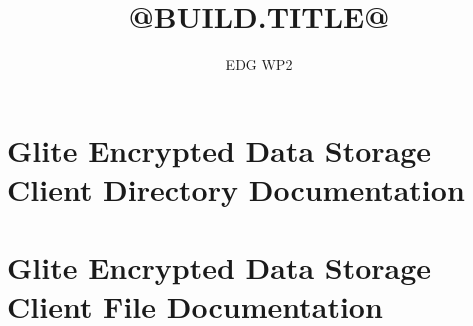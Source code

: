 \documentclass[a4paper]{datagridreport}
\title{@BUILD.TITLE@}
\author{EDG WP2}
\begin{document}
\section{Glite Encrypted Data Storage Client Directory Documentation}





\section{Glite Encrypted Data Storage Client File Documentation}

\printindex
\end{document}
